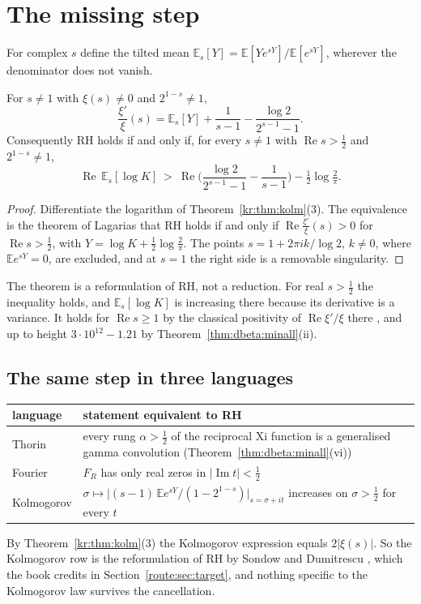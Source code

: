 \section{The missing step}\label{kr:sec:missing}
For complex $s$ define the tilted mean $\mathbb E_s[Y]=\mathbb E[Ye^{sY}]/\mathbb E[e^{sY}]$, wherever the denominator does not vanish.
\begin{theorem}\label{kr:thm:missing}
For $s\ne1$ with $\xi(s)\ne0$ and $2^{1-s}\ne1$,
\[
\frac{\xi'}{\xi}(s)=\mathbb E_s[Y]+\frac1{s-1}-\frac{\log2}{2^{s-1}-1}.
\]
Consequently RH holds if and only if, for every $s\ne1$ with $\operatorname{Re}s>\frac12$ and $2^{1-s}\ne1$,
\begin{equation}\label{kr:eq:missing}
\operatorname{Re}\,\mathbb E_s[\log K]\ >\ \operatorname{Re}\Big(\frac{\log2}{2^{s-1}-1}-\frac1{s-1}\Big)-\tfrac12\log\tfrac2\pi .
\end{equation}
\end{theorem}
\begin{proof}
Differentiate the logarithm of Theorem~\ref{kr:thm:kolm}(3). The equivalence is the theorem of Lagarias \cite{Lagarias} that RH holds if and only if $\operatorname{Re}\frac{\xi'}{\xi}(s)>0$ for $\operatorname{Re}s>\frac12$, with $Y=\log K+\frac12\log\frac2\pi$. The points $s=1+2\pi ik/\log2$, $k\ne0$, where $\mathbb Ee^{sY}=0$, are excluded, and at $s=1$ the right side is a removable singularity.
\end{proof}
The theorem is a reformulation of RH, not a reduction. For real $s>\frac12$ the inequality holds, and $\mathbb E_s[\log K]$ is increasing there because its derivative is a variance. It holds for $\operatorname{Re}s\ge1$ by the classical positivity of $\operatorname{Re}\xi'/\xi$ there \cite{Lagarias}, and up to height $3\cdot10^{12}-1.21$ by Theorem~\ref{thm:dbeta:minall}(ii).

\subsection*{The same step in three languages}
\begin{center}
\small
\begin{tabular}{p{}p{}}
\toprule
language & statement equivalent to RH\\
\midrule
Thorin & every rung $\alpha>\frac12$ of the reciprocal Xi function is a generalised gamma convolution (Theorem~\ref{thm:dbeta:minall}(vi))\\
Fourier & $F_R$ has only real zeros in $|\operatorname{Im}t|<\frac12$\\
Kolmogorov & $\sigma\mapsto\big|(s-1)\,\mathbb Ee^{sY}/(1-2^{1-s})\big|_{s=\sigma+it}$ increases on $\sigma>\frac12$ for every $t$\\
\bottomrule
\end{tabular}
\end{center}
By Theorem~\ref{kr:thm:kolm}(3) the Kolmogorov expression equals $2|\xi(s)|$. So the Kolmogorov row is the reformulation of RH by Sondow and Dumitrescu \cite{SD10}, which the book credits in Section~\ref{route:sec:target}, and nothing specific to the Kolmogorov law survives the cancellation.

